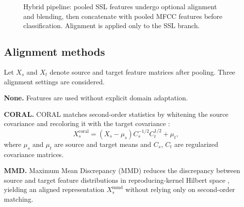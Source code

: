 \documentclass[9pt,twocolumn,letterpaper]{article}
\begin{document}
\begin{figure}[t]
\centering
{}
\caption{Hybrid pipeline: pooled SSL features undergo optional alignment and blending, then concatenate with pooled MFCC features before classification. Alignment is applied only to the SSL branch.}
\label{fig:pipeline}
\end{figure}

\subsection{Alignment methods}
Let $X_s$ and $X_t$ denote source and target feature matrices after pooling. Three alignment settings are considered.

\textbf{None.} Features are used without explicit domain adaptation.

\textbf{CORAL.} CORAL matches second-order statistics by whitening the source covariance and recoloring it with the target covariance \cite{sun2016deep}:
\begin{equation}
X_s^{\mathrm{coral}} = (X_s - \mu_s) C_s^{-1/2} C_t^{1/2} + \mu_t,
\end{equation}
where $\mu_s$ and $\mu_t$ are source and target means and $C_s$, $C_t$ are regularized covariance matrices.

\textbf{MMD.} Maximum Mean Discrepancy (MMD) reduces the discrepancy between source and target feature distributions in reproducing-kernel Hilbert space \cite{gretton2012kernel}, yielding an aligned representation $X_s^{\mathrm{mmd}}$ without relying only on second-order matching.
\end{document}
